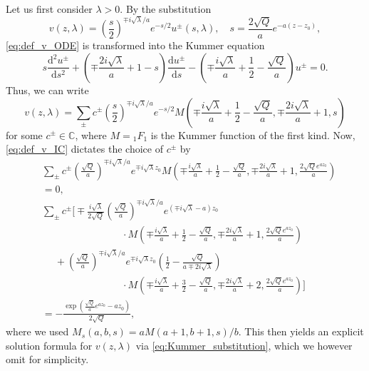 \documentclass[11pt,twoside,reqno,centertags]{amsart}
\theoremstyle{definition}
\newcommand{\C}{\mathbb C}
\newcommand{\dd}{\mathrm d}
\begin{document}
Let us first consider $\lambda>0$. By the substitution
\begin{equation}\label{eq:Kummer_substitution}
	v(z,\lambda) = \left(\frac{s}{2}\right)^{\mp i\sqrt{\lambda}/a} e^{-s/2} u^\pm(s,\lambda), \quad s = \frac{2\sqrt Q}{a} e^{-a(z-z_0)},
\end{equation}
\eqref{eq:def_v_ODE} is transformed into the Kummer equation
\[s\frac{\dd^2 u^\pm}{\dd s^2} + \left(\mp\frac{2i\sqrt{\lambda}}{a} + 1 - s\right) \frac{\dd u^\pm}{\dd s} - \left(\mp\frac{i\sqrt{\lambda}}{a} + \frac12 - \frac{\sqrt Q}{a}\right) u^\pm = 0.\]
Thus, we can write
\[v(z,\lambda) = \sum_\pm c^\pm \left(\frac{s}{2}\right)^{\mp i\sqrt{\lambda}/a} e^{-s/2} M\left(\mp\frac{i\sqrt{\lambda}}{a} + \frac12 - \frac{\sqrt Q}{a}, \mp\frac{2i\sqrt{\lambda}}{a} + 1, s\right)\]
for some $c^\pm\in\C$, where $M={}_1F_1$ is the Kummer function of the first kind. Now, \eqref{eq:def_v_IC} dictates the choice of $c^\pm$ by
\begin{align*}
	&\sum_\pm c^\pm \left(\frac{\sqrt Q}{a}\right)^{\mp i\sqrt\lambda/a} e^{\mp i\sqrt\lambda z_0} M\left(\mp\frac{i\sqrt{\lambda}}{a} + \frac12 - \frac{\sqrt Q}{a}, \mp\frac{2i\sqrt{\lambda}}{a} + 1, \frac{2\sqrt Q e^{az_0}}{a}\right)\\
	&= 0,\\
	&\sum_\pm c^\pm \Bigg[ \mp \frac{i\sqrt\lambda}{2\sqrt Q} \left(\frac{\sqrt Q}{a}\right)^{\mp i\sqrt\lambda/a} e^{(\mp i\sqrt\lambda-a) z_0}\\
	&\qquad\qquad\qquad\qquad \cdot M\left(\mp\frac{i\sqrt{\lambda}}{a} + \frac12 - \frac{\sqrt Q}{a}, \mp\frac{2i\sqrt{\lambda}}{a} + 1, \frac{2\sqrt Q e^{az_0}}{a}\right)\\
	&\quad\;+ \left(\frac{\sqrt Q}{a}\right)^{\mp i\sqrt\lambda/a} e^{\mp i\sqrt\lambda z_0}\left(\frac12-\frac{\sqrt Q}{a\mp 2i\sqrt\lambda}\right)\\
	&\qquad\qquad\qquad\qquad \cdot M\left(\mp\frac{i\sqrt{\lambda}}{a} + \frac32 - \frac{\sqrt Q}{a}, \mp\frac{2i\sqrt{\lambda}}{a} + 2, \frac{2\sqrt Q e^{az_0}}{a}\right)\Bigg]\\
	&= -\frac{\exp\left(\frac{\sqrt Q}{a}e^{az_0}-az_0\right)}{2\sqrt Q},
\end{align*}
where we used $M_s(a,b,s)=aM(a+1,b+1,s)/b$. This then yields an explicit solution formula for $v(z,\lambda)$ via \eqref{eq:Kummer_substitution}, which we however omit for simplicity.
\end{document}
